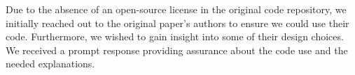 Due to the absence of an open-source license in the original code repository, we initially reached out to the original paper's authors to ensure we could use their code. Furthermore, we wished to gain insight into some of their design choices. We received a prompt response providing assurance about the code use and the needed explanations.















